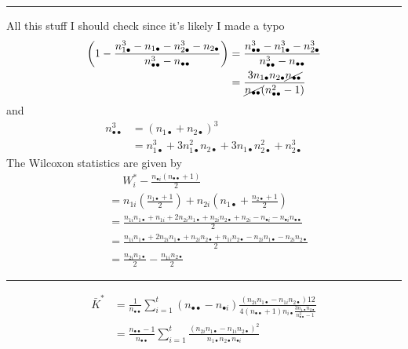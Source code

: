 \documentclass[a4paper,12pt]{amsart}
\begin{document}
\bigskip
\hrule
\bigskip
All this stuff I should check since it's likely I made a typo
\begin{align*}
\left(1 - \frac{n_{1\bullet}^3 - n_{1 \bullet} - n_{2 \bullet}^3 - n_{2 \bullet}}{n_{\bullet \bullet}^3 - n_{\bullet \bullet}}\right) &= \frac{n_{\bullet \bullet}^3 - n_{1 \bullet}^3 - n_{2 \bullet}^3}{n_{\bullet \bullet}^3 - n_{\bullet \bullet}}\\
&= \frac{3n_{1\bullet} n_{2 \bullet} \cancel{n_{\bullet \bullet}}}{\cancel{n_{\bullet \bullet}}(n_{\bullet \bullet}^2-1)}
\end{align*}
and
\begin{align*}
n_{\bullet \bullet}^3 &= (n_{1 \bullet} + n_{2 \bullet})^3\\
&= n_{1 \bullet}^3 + 3n_{1 \bullet}^2n_{2 \bullet} + 3 n_{1 \bullet} n_{2 \bullet}^2 + n_{2 \bullet}^3
\end{align*}
The Wilcoxon statistics are given by
\begin{align*}
& \quad \; W_i^* - \frac{n_{\bullet i}(n_{\bullet \bullet} + 1)}{2}\\
&= n_{1i}\left(\frac{n_{1 \bullet} + 1}{2}\right) + n_{2i} \left(n_{1 \bullet} + \frac{n_{2 \bullet} + 1}{2}\right)\\
&= \frac{n_{1i}n_{1 \bullet} + n_{1i} + 2n_{2i}n_{1 \bullet} + n_{2i}n_{2 \bullet} + n_{2i} - n_{\bullet i} - n_{\bullet i}n_{\bullet \bullet}}{2}\\
&=\frac{n_{1i}n_{1 \bullet} + 2n_{2i}n_{1 \bullet} + n_{2i}n_{2 \bullet} + n_{1i} n_{2 \bullet} - n_{2i}n_{1 \bullet} - n_{2i}n_{2 \bullet}}{2}\\
&= \frac{n_{2i}n_{1 \bullet}}{2} - \frac{n_{1 i} n_{2 \bullet}}{2}
\end{align*}
\bigskip
\hrule
\bigskip
\begin{align*}
\bar{K}^* &= \frac{1}{n_{\bullet \bullet}} \sum_{i=1}^t(n_{\bullet \bullet} - n_{\bullet i}) \frac{(n_{2i}n_{1 \bullet} - n_{1i}n_{2 \bullet})12}{4(n_{\bullet \bullet} + 1)n_{i \bullet}\frac{3n_{1\bullet} n_{2 \bullet}}{n_{\bullet \bullet}^2 - 1}}\\
&= \frac{n_{\bullet \bullet}-1}{n_{\bullet\bullet}} \sum_{i=1}^t \frac{(n_{2i}n_{1 \bullet} - n_{1i}n_{2 \bullet})^2}{n_{1 \bullet}n_{2 \bullet} n_{\bullet i}}
\end{align*}
\end{document}
